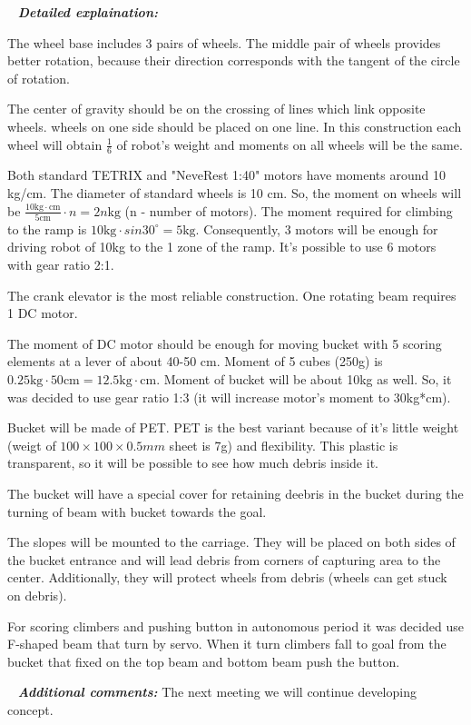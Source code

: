    \newline
  \textit{\textbf{Detailed explaination:}}
  \begin{enumerate*}
  	\item The wheel base includes 3 pairs of wheels. The middle pair of wheels provides better rotation, because their direction corresponds with the tangent of the circle of rotation.
  	
  	The center of gravity should be on the crossing of lines which link opposite wheels. wheels on one side should be placed on one line. In this construction each wheel will obtain $\frac{1}{6}$ of robot's weight and moments on all wheels will be the same. 
  	
  	
  	\item Both standard TETRIX and "NeveRest 1:40" motors have moments around 10 kg/cm. The diameter of standard wheels is 10 cm. So, the moment on wheels will be $\frac{10\text{kg} \cdot \text{cm}}{5\text{cm}} \cdot n = 2n\text{kg}$ (n - number of motors). The moment required for climbing to the ramp is $10\text{kg} \cdot sin30^\circ = 5\text{kg}$. Consequently, 3 motors will be enough for driving robot of 10kg to the 1 zone of the ramp. It's possible to use 6 motors with gear ratio 2:1.
  	\item The crank elevator is the most reliable construction. One rotating beam requires 1 DC motor.
  	
  	The moment of DC motor should be enough for moving bucket with 5 scoring elements at a lever of about 40-50 cm. Moment of 5 cubes (250g) is $0.25\text{kg} \cdot 50\text{cm} = 12.5\text{kg} \cdot \text{cm}$. Moment of bucket will be about 10kg as well. So, it was decided to use gear ratio 1:3 (it will increase motor's moment to 30kg*cm).
  	\item Bucket will be made of PET. PET is the best variant because of it's little weight (weigt of $100\times 100 \times 0.5mm$ sheet is 7g) and flexibility. This plastic is transparent, so it will be possible to see how much debris inside it.
  	
  	The bucket will have a special cover for retaining deebris in the bucket during the turning of beam with bucket towards the goal.
  	
  	\item The slopes will be mounted to the carriage. They will be placed on both sides of the bucket entrance and will lead debris from corners of capturing area to the center. Additionally, they will protect wheels from debris (wheels can get stuck on debris).
  	
  	
  	\item For scoring climbers and pushing button in autonomous period it was decided use F-shaped beam that turn by servo. When it turn climbers fall to goal from the bucket that fixed on the top beam and bottom beam push the button.
  	
  \end{enumerate*}
  
   \newline
  \textit{\textbf{Additional comments:}} The next meeting we will continue developing concept.

\fillpage
